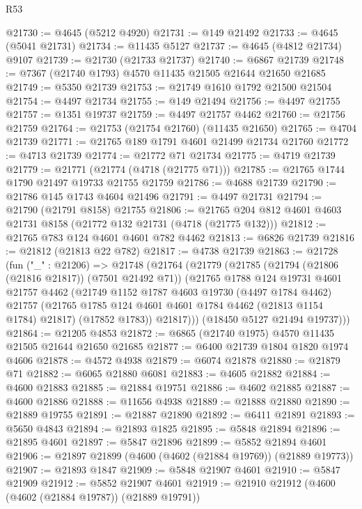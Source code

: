 \begin{lexlean}{R53}
\begin{coremodule}
@21730 := @4645 (@5212 @4920)
@21731 := @149 @21492
@21733 := @4645 (@5041 @21731)
@21734 := @11435 @5127
@21737 := @4645 (@4812 @21734) @9107
@21739 := @21730 (@21733 @21737)
@21740 := @6867 @21739
@21748 := @7367 (@21740 @1793) @4570 @11435 @21505 @21644 @21650 @21685
@21749 := @5350 @21739
@21753 := @21749 @1610 @1792 @21500 @21504
@21754 := @4497 @21734
@21755 := @149 @21494
@21756 := @4497 @21755
@21757 := @1351 @19737
@21759 := @4497 @21757 @4462
@21760 := @21756 @21759
@21764 := @21753 (@21754 @21760) (@11435 @21650)
@21765 := @4704 @21739
@21771 := @21765 @189 @1791 @4601 @21499 @21734 @21760
@21772 := @4713 @21739
@21774 := @21772 @71 @21734
@21775 := @4719 @21739
@21779 := @21771 (@21774 (@4718 (@21775 @71)))
@21785 := @21765 @1744 @1790 @21497 @19733 @21755 @21759
@21786 := @4688 @21739
@21790 := @21786 @145 @1743 @4604 @21496
@21791 := @4497 @21731
@21794 := @21790 (@21791 @8158) @21755
@21806 := @21765 @204 @812 @4601 @4603 @21731 @8158 (@21772 @132 @21731 (@4718 (@21775 @132)))
@21812 := @21765 @783 @124 @4601 @4601 @782 @4462
@21813 := @6826 @21739
@21816 := @21812 (@21813 @22 @782)
@21817 := @4738 @21739
@21863 := @21728
    (fun ("_" : @21206) =>
    @21748
      (@21764
        (@21779
          (@21785
            (@21794 (@21806 (@21816 @21817)) (@7501 @21492 @71))
            (@21765
              @1788
              @124
              @19731
              @4601
              @21757
              @4462
              (@21749
                @1152
                @1787
                @4603
                @19730
                (@4497 @1784 @4462)
                @21757
                (@21765 @1785 @124 @4601 @4601 @1784 @4462 (@21813 @1154 @1784) @21817)
                (@17852 @1783))
              @21817)))
        (@18450 @5127 @21494 @19737)))
@21864 := @21205 @4853
@21872 := @6865 (@21740 @1975) @4570 @11435 @21505 @21644 @21650 @21685
@21877 := @6400 @21739 @1804 @1820 @1974 @4606
@21878 := @4572 @4938
@21879 := @6074 @21878
@21880 := @21879 @71
@21882 := @6065 @21880 @6081
@21883 := @4605 @21882
@21884 := @4600 @21883
@21885 := @21884 @19751
@21886 := @4602 @21885
@21887 := @4600 @21886
@21888 := @11656 @4938
@21889 := @21888 @21880
@21890 := @21889 @19755
@21891 := @21887 @21890
@21892 := @6411 @21891
@21893 := @5650 @4843
@21894 := @21893 @1825
@21895 := @5848 @21894
@21896 := @21895 @4601
@21897 := @5847 @21896
@21899 := @5852 @21894 @4601
@21906 := @21897 @21899 (@4600 (@4602 (@21884 @19769)) (@21889 @19773))
@21907 := @21893 @1847
@21909 := @5848 @21907 @4601
@21910 := @5847 @21909
@21912 := @5852 @21907 @4601
@21919 := @21910 @21912 (@4600 (@4602 (@21884 @19787)) (@21889 @19791))

\end{coremodule}
\end{lexlean}
